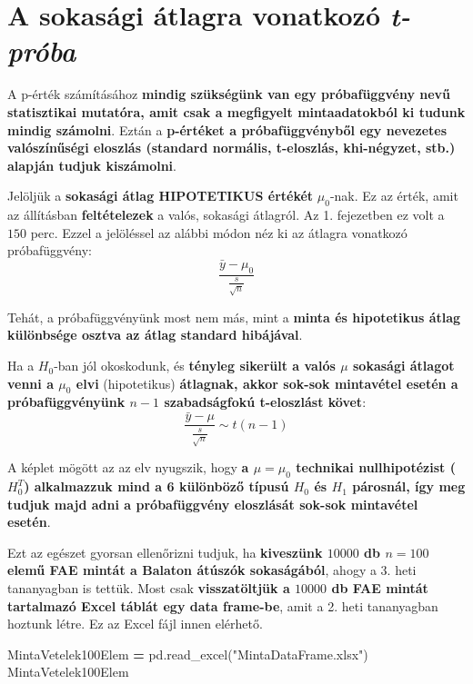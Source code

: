 \documentclass[
]{book}
\newenvironment{Shaded}{\begin{snugshade}}{\end{snugshade}}
\newcommand{\NormalTok}[1]{#1}
\newcommand{\OperatorTok}[1]{\textcolor[rgb]{0.81,0.36,0.00}{\textbf{#1}}}
\newcommand{\StringTok}[1]{\textcolor[rgb]{0.31,0.60,0.02}{#1}}
\begin{document}
\section{\texorpdfstring{A sokasági átlagra vonatkozó \emph{t-próba}}{A sokasági átlagra vonatkozó t-próba}}\label{a-sokasuxe1gi-uxe1tlagra-vonatkozuxf3-t-pruxf3ba}

A p-érték számításához \textbf{mindig szükségünk van egy próbafüggvény nevű statisztikai mutatóra, amit csak a megfigyelt mintaadatokból ki tudunk mindig számolni}. Eztán a \textbf{p-értéket a próbafüggvényből egy nevezetes valószínűségi eloszlás (standard normális, t-eloszlás, khi-négyzet, stb.) alapján tudjuk kiszámolni}.

Jelöljük a \textbf{sokasági átlag HIPOTETIKUS értékét} \(\mu_0\)-nak. Ez az érték, amit az állításban \textbf{feltételezek} a valós, sokasági átlagról. Az 1. fejezetben ez volt a \(150\) perc. Ezzel a jelöléssel az alábbi módon néz ki az átlagra vonatkozó próbafüggvény: \[\frac{\bar{y}-\mu_0}{\frac{s}{\sqrt{n}}}\]

Tehát, a próbafüggvényünk most nem más, mint a \textbf{minta és hipotetikus átlag különbsége osztva az átlag standard hibájával}.

Ha a \(H_0\)-ban jól okoskodunk, és \textbf{tényleg sikerült a valós \(\mu\) sokasági átlagot venni a \(\mu_0\) elvi} (hipotetikus) \textbf{átlagnak, akkor sok-sok mintavétel esetén a próbafüggvényünk \(n-1\) szabadságfokú t-eloszlást követ}: \[\frac{\bar{y}-\mu}{\frac{s}{\sqrt{n}}} \sim t(n-1)\]

A képlet mögött az az elv nyugszik, hogy \textbf{a \(\mu = \mu_0\) technikai nullhipotézist (\(H_0^T\)) alkalmazzuk mind a 6 különböző típusú \(H_0\) és \(H_1\) párosnál, így meg tudjuk majd adni a próbafüggvény eloszlását sok-sok mintavétel esetén}.

Ezt az egészet gyorsan ellenőrizni tudjuk, ha \textbf{kiveszünk \(10000\) db \(n=100\) elemű FAE mintát a Balaton átúszók sokaságából}, ahogy a 3. heti tananyagban is tettük.
Most csak \textbf{visszatöltjük a \(10000\) db FAE mintát tartalmazó Excel táblát egy data frame-be}, amit a 2. heti tananyagban hoztunk létre. Ez az Excel fájl innen elérhető.

\begin{Shaded}
\begin{Highlighting}[]
\NormalTok{MintaVetelek100Elem }\OperatorTok{=}\NormalTok{ pd.read\_excel(}\StringTok{"MintaDataFrame.xlsx"}\NormalTok{)}
\NormalTok{MintaVetelek100Elem}
\end{Highlighting}
\end{Shaded}
\end{document}
